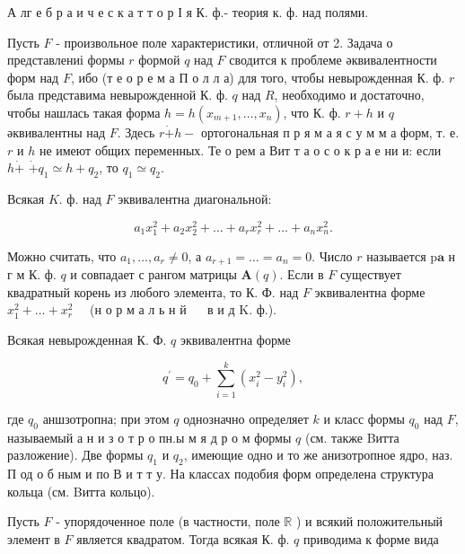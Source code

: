 \documentclass[10pt]{article}
\begin{document}
А лг е б р а и ч е с к а т т о р І я К. ф.- теория к. ф. над полями.



Пусть $F$ - произвольное поле характеристики, отличной от 2. Задача о представлениі формы $r$ формой $q$ над $F$ сводится к проблеме әквивалентности форм над $F$, ибо (т е о р е м а П о л л а) для того, чтобы невырожденная К. ф. $r$ была представима невырожденной К. ф. $q$ над $R$, необходимо и достаточно, чтобы нашлась такая форма $h=h\left(x_{m+1}, \ldots, x_{n}\right)$, что К. ф. $r+h$ и $q$ әквивалентны над $F$. Здесь $r \dot{+} h-$ ортогональная п р я м а я с у м м а форм, т. е. $r$ и $h$ не имеют общих переменных. Те о рем а Вит т а о с о к р а е ни и: если $h \dot{+}$ $\dot{+} q_{1} \simeq h+q_{2}$, то $q_{1} \simeq q_{2}$.



Всякая $K$. ф. над $F$ эквивалентна диагональной:



\[

a_{1} x_{1}^{2}+a_{2} x_{2}^{2}+\ldots+a_{r} x_{r}^{2}+\ldots+a_{n} x_{n}^{2} .

\]



Можно считать, что $a_{1}, \ldots, a_{r} \neq 0$, а $a_{r+1}=\ldots=a_{n}=0$. Число $r$ называется $\mathrm{p} \mathbf{a}$ н г м К. ф. $q$ и совпадает с рангом матрицы $\boldsymbol{A}(q)$. Если в $F$ существует квадратный корень из любого элемента, то К. Ф. над $F$ эквивалентна форме $x_{1}^{2}+\ldots+x_{r}^{2} \quad$ (н о р м а л ь н й $\quad$ в и д K. ф.).



Всякая невырожденная К. Ф. $q$ эквивалентна форме



\[

q^{\prime}=q_{0}+\sum_{i=1}^{k}\left(x_{i}^{2}-y_{i}^{2}\right),

\]



где $q_{0}$ аншзотропна; при этом $q$ однозначно определяет $k$ и класс формы $q_{0}$ над $F$, называемый а н и з о т р о пн.ы м я д р о м формы $q$ (см. также Bитта разложение). Две формы $q_{1}$ и $q_{2}$, имеющие одно и то же анизотропное ядро, наз. П од о б ным и по В и т т у. На классах подобия форм определена структура кольца (см. Bитта кольцо).



Пусть $F$ - упорядоченное поле (в частности, поле $\mathbb{R}$ ) и всякий положительный элемент в $F$ является квадратом. Тогда всякая К. ф. $q$ приводима к форме вида
\end{document}
